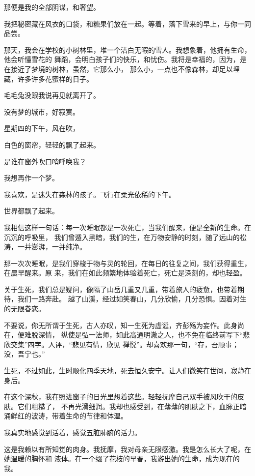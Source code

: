		那便是我的全部阴谋，和奢望。

		我把秘密藏在风衣的口袋，和糖果们放在一起。等着，落下雪来的早上，与你一同品尝。

		那天，我会在学校的小树林里，堆一个洁白无暇的雪人。我想象着，他拥有生命，他会听懂雪花的
	舞蹈，会明白孩子们的快乐，和忧伤。我将是幸福的，因为，是在接近了梦境的树林，虽然，它那么小，
	那么小，一点也不像森林，却足以埋藏，许多许多花蜜样的日子。

		毛毛兔没跟我说再见就离开了。

		没有梦的城市，好寂寞。

		星期四的下午，风在吹，

		白色的窗帘，轻轻的飘了起来。

		是谁在窗外吹口哨呼唤我？

		我想再作一个梦。

		我喜欢，是迷失在森林的孩子。飞行在柔光依稀的下午。

		世界都飘了起来。

	\endwriting



		我相信这样一句话：每一次睡眠都是一次死亡，当我们醒来，便是全新的生命。在沉沉的呼吸里，
	我们曾遁入黑暗，我们的生，在万物安静的时刻，随了远山的松涛，一并澎湃，一并纯净。

		那一次次睡眠，是我们穿梭于物与灵的轮回，在每日的往复之间，我们获得重生，在晨早醒来。原
	来，我们在如此频繁地体验着死亡，死亡是深刻的，却也轻盈。

		关于生死，我们总是疑问，像隔了山岳几重又几重，带着旅人的疲惫，也带着期待，我们一路奔赴。
	越了山溪，经过如笑春山，几分欣愉，几分恐惧。因着对生的无限眷恋。

		不要说，你无所谓于生死，古人亦叹，知一生死为虚诞，齐彭殇为妄作。此身尚在，便难脱深情，
	纵使是弘一法师，如此高通明澈之人，也不免在临终前写下“悲欣交集”四字。人评，“悲见有情，欣见
	禅悦”。却喜欢那一句，“存，吾顺事；没，吾宁也。”

		生死，不过如此，生时顺化四季天地，死去恒久安宁。让人们微笑在世间，寂静在身后。

		在这个深秋，我在照进窗子的日光里想着这些。轻轻抚摩自己双手被风吹干的皮肤。它们粗糙了，
	不再光滑细润。我却也感受到，在薄薄的肌肤之下，血脉正暗涌鲜红的波涛，带着生命的节律和体温。

		我真实地感觉到活着，感觉五脏肺腑的活力。

		这是我赖以有所知觉的肉身。我抚摩，我对母亲无限感激。我是怎么长大了呢，在她温暖的胸怀和
	液体。在一个缀了花枝的早春，我游出她的生命，成为现在的我。

